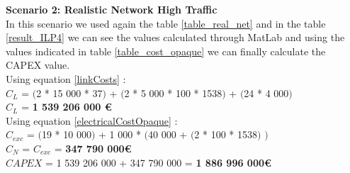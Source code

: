 \textbf{Scenario 2: Realistic Network High Traffic} \label{Scenario4_opaque_p} \\

In this scenario we used again the table \ref{table_real_net} and in the table \ref{result_ILP4} we can see the values calculated through MatLab and using the values indicated in table \ref{table_cost_opaque} we can finally calculate the CAPEX value. \\

Using equation \ref{linkCosts} : \\
$C_L$ = $($2 * 15 000 * 37$)$ + $($2 * 5 000 * 100 * 1538$)$ + $($24 * 4 000$)$ \\
$C_L$ = \textbf{1 539 206 000 \euro} \\

Using equation \ref{electricalCostOpaque} : \\
$C_{exc}$ = $($19 * 10 000$)$ + 1 000 * $($40 000 + $($2 * 100 * 1538$)$ $)$ \\
$C_N$ = $C_{exc}$ = \textbf{347 790 000\euro} \\

$CAPEX$ = 1 539 206 000 + 347 790 000 = \textbf{1 886 996 000\euro}\\

